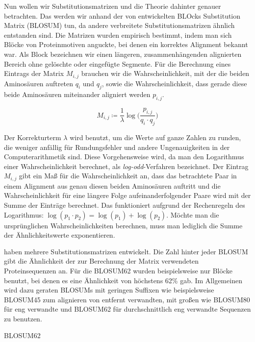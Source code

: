 Nun wollen wir Substitutionsmatrizen und die Theorie dahinter genauer betrachten. Das werden wir anhand der von \cite{hh92} entwickelten BLOcks Substitution Matrix (BLOSUM) tun, da andere verbreitete Substitutionsmatrizen ähnlich entstanden sind. Die Matrizen wurden empirisch bestimmt, indem man sich Blöcke von Proteinmotiven anguckte, bei denen ein korrektes Alignment bekannt war. Als Block bezeichnen wir einen längeren, zusammenhängenden alignierten Bereich ohne gelöschte oder eingefügte Segmente. Für die Berechnung eines Eintrags der Matrix $M_{i,j}$ brauchen wir die Wahrscheinlichkeit, mit der die beiden Aminosäuren auftreten $q_i$ und $q_j$, sowie die Wahrscheinlichkeit, dass gerade diese beide Aminosäuren miteinander aligniert werden $p_{i,j}$.

\begin{equation}
	M_{i,j} \coloneqq \frac{1}{\lambda} \log\bigg( \frac{p_{i,j}}{q_i\cdot q_j} \bigg)
\end{equation}

Der Korrekturterm $\lambda$ wird benutzt, um die Werte auf ganze Zahlen zu runden, die weniger anfällig für Rundungsfehler und andere Ungenauigkeiten in der Computerarithmetik sind. Diese Vorgehensweise wird, da man den Logarithmus einer Wahrscheinlichkeit berechnet, als \emph{log-odd}-Verfahren bezeichnet. Der Eintrag $M_{i,j}$ gibt ein Maß für die Wahrscheinlichkeit an, dass das betrachtete Paar in einem Alignment aus genau diesen beiden Aminosäuren auftritt und die Wahrscheinlichkeit für eine längere Folge aufeinanderfolgender Paare wird mit der Summe der Einträge berechnet. Das funktioniert aufgrund der Rechenregeln des Logarithmus: $\log(p_1 \cdot p_2) = \log(p_1) + \log(p_2)$. Möchte man die ursprünglichen Wahrscheinlichkeiten berechnen, muss man lediglich die Summe der Ähnlichkeitswerte exponentieren. 

\cite{hh92} haben mehrere Substitutionsmatrizen entwickelt. Die Zahl hinter jeder BLOSUM gibt die Ähnlichkeit der zur Berechnung der Matrix verwendeten Proteinsequenzen an. Für die BLOSUM62 wurden beispielsweise nur Blöcke benutzt, bei denen es eine Ähnlichkeit von höchstens 62\% gab. Im Allgemeinen wird dazu geraten BLOSUMs mit geringen Suffixen wie beispielsweise BLOSUM45 zum alignieren von entfernt verwandten, mit großen wie BLOSUM80 für eng verwandte und BLOSUM62 für durchschnittlich eng verwandte Sequenzen zu benutzen.

BLOSUM62

